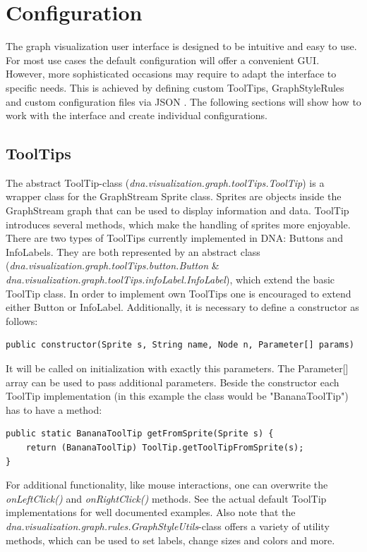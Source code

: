 \chapter{Configuration}
The graph visualization user interface is designed to be intuitive and easy to use. For most use cases the default configuration will offer a convenient GUI. However, more sophisticated occasions may require to adapt the interface to specific needs. This is achieved by defining custom ToolTips, GraphStyleRules and custom configuration files via JSON \cite{json}. The following sections will show how to work with the interface and create individual configurations.

\section{ToolTips}
\label{s:impl-tooltips}
The abstract ToolTip-class (\textit{dna.visualization.graph.toolTips.ToolTip}) is a wrapper class for the GraphStream Sprite class. Sprites are objects inside the GraphStream graph that can be used to display information and data. ToolTip introduces several methods, which make the handling of sprites more enjoyable. There are two types of ToolTips currently implemented in DNA: Buttons and InfoLabels. They are both represented by an abstract class (\textit{dna.visualization.graph.toolTips.button.Button} \& \textit{dna.visualization.graph.toolTips.infoLabel.InfoLabel}), which extend the basic ToolTip class. In order to implement own ToolTips one is encouraged to extend either Button or InfoLabel. Additionally, it is necessary to define a constructor as follows:
\begin{lstlisting}
public constructor(Sprite s, String name, Node n, Parameter[] params)
\end{lstlisting}
It will be called on initialization with exactly this parameters. The Parameter[] array can be used to pass additional parameters. Beside the constructor each ToolTip implementation (in this example the class would be "BananaToolTip") has to have a method:
\begin{lstlisting}
public static BananaToolTip getFromSprite(Sprite s) {
	return (BananaToolTip) ToolTip.getToolTipFromSprite(s);
}
\end{lstlisting}
For additional functionality, like mouse interactions, one can overwrite the \textit{onLeftClick()} and \textit{onRightClick()} methods. See the actual default ToolTip implementations for well documented examples. Also note that the \emph{dna.visualization.graph.rules.GraphStyleUtils}-class offers a variety of utility methods, which can be used to set labels, change sizes and colors and more.


